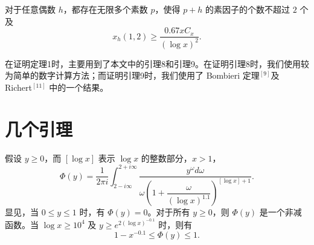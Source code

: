 \begin{theorem}
对于任意偶数 $h$，都存在无限多个素数 $p$，使得 $p+h$ 的素因子的个数不超过 $2$ 个及
\[
x_h(1,2)\geqslant\frac{0.67xC_x}{(\log x)^2}.
\]
\end{theorem}

在证明定理1时，主要用到了本文中的引理8和引理9。在证明引理8时，我们使用较为简单的数字计算方法；而证明引理9时，我们使用了 Bombieri 定理$^{[9]}$及 Richert$^{[11]}$ 中的一个结果。

\section{几个引理}

\begin{lemma}
假设 $y\geqslant0$，而 $[\log x]$ 表示 $\log x$ 的整数部分，$x>1$，
\[
\Phi(y)=\frac{1}{2\pi i}\int_{2-i\infty}^{2+i\infty}\frac{y^\omega d\omega}{\omega\left(1+\dfrac{\omega}{(\log x)^{1.1}}\right)^{[\log x]+1}}.
\]
显见，当 $0\leqslant y\leqslant1$ 时，有 $\Phi(y)=0$。对于所有 $y\geqslant0$，则 $\Phi(y)$ 是一个非减函数。当 $\log x\geqslant10^4$ 及 $y\geqslant e^{2(\log x)^{-0.1}}$ 时，则有
\[
1-x^{-0.1}\leqslant\Phi(y)\leqslant1.
\]
\end{lemma}

